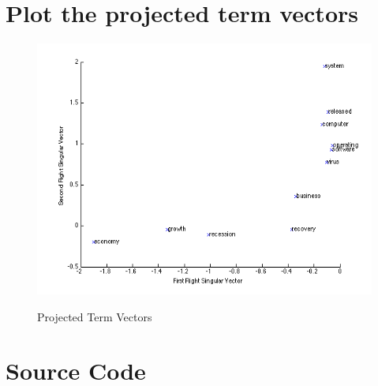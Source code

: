 \documentclass[11pt,a4paper]{article}
\begin{document}
\section{Plot the projected term vectors}
\begin{figure}[h]
    \centering
    \includegraphics[width=5.5in,height=3.in]{./6s.png} \\
    \caption{Projected Term Vectors}
\end{figure}

\newpage
\section{Source Code}


\end{document}
